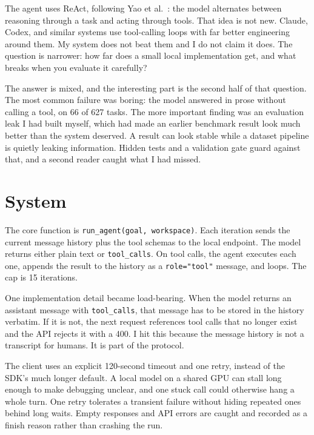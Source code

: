 \documentclass[11pt]{article}
\newcommand{\code}[1]{\texttt{\small #1}}
\begin{document}
The agent uses ReAct, following Yao et al.~\cite{react}: the model alternates between reasoning through a
task and acting through tools. That idea is not new. Claude, Codex, and similar systems use tool-calling
loops with far better engineering around them. My system does not beat them and I do not claim it does.
The question is narrower: how far does a small local implementation get, and what breaks when you evaluate
it carefully?

The answer is mixed, and the interesting part is the second half of that question. The most common failure
was boring: the model answered in prose without calling a tool, on 66 of 627 tasks. The more important
finding was an evaluation leak I had built myself, which had made an earlier benchmark result look much
better than the system deserved. A result can look stable while a dataset pipeline is quietly leaking
information. Hidden tests and a validation gate guard against that, and a second reader caught what I had
missed.

\section{System}
The core function is \code{run\_agent(goal, workspace)}. Each iteration sends the current message history
plus the tool schemas to the local endpoint. The model returns either plain text or \code{tool\_calls}. On
tool calls, the agent executes each one, appends the result to the history as a \code{role="tool"}
message, and loops. The cap is 15 iterations.

One implementation detail became load-bearing. When the model returns an assistant message with
\code{tool\_calls}, that message has to be stored in the history verbatim. If it is not, the next request
references tool calls that no longer exist and the API rejects it with a 400. I hit this because the
message history is not a transcript for humans. It is part of the protocol.

The client uses an explicit 120-second timeout and one retry, instead of the SDK's much longer default. A
local model on a shared GPU can stall long enough to make debugging unclear, and one stuck call could
otherwise hang a whole turn. One retry tolerates a transient failure without hiding repeated ones behind
long waits. Empty responses and API errors are caught and recorded as a finish reason rather than
crashing the run.
\end{document}

